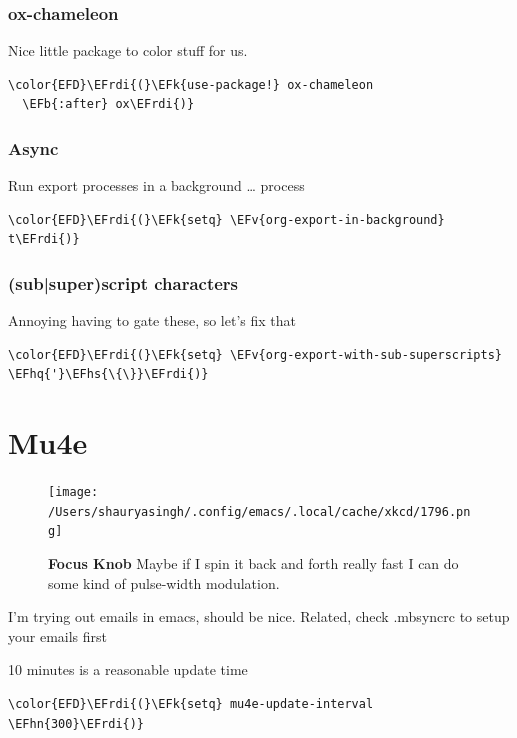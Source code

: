 \documentclass{scrartcl}
\newcommand{\EFk}[1]{\textcolor{EFk}{#1}} %
\newcommand{\EFb}[1]{\textcolor{EFb}{#1}} %
\newcommand{\EFv}[1]{\textcolor{EFv}{#1}} %
\newcommand{\EFhn}[1]{#1} %
\newcommand{\EFhq}[1]{#1} %
\newcommand{\EFhs}[1]{#1} %
\newcommand{\EFrdi}[1]{#1} %
\begin{document}
\subsubsection{ox-chameleon}
\label{sec:orgffcfcee}
Nice little package to color stuff for us.
\begin{Code}
\begin{Verbatim}[]
\color{EFD}\EFrdi{(}\EFk{use-package!} ox-chameleon
  \EFb{:after} ox\EFrdi{)}
\end{Verbatim}
\end{Code}

\subsubsection{Async}
\label{sec:org4641dd2}
Run export processes in a background \ldots{} process
\begin{Code}
\begin{Verbatim}[]
\color{EFD}\EFrdi{(}\EFk{setq} \EFv{org-export-in-background} t\EFrdi{)}
\end{Verbatim}
\end{Code}

\subsubsection{(sub|super)script characters}
\label{sec:org32b114e}
Annoying having to gate these, so let's fix that
\begin{Code}
\begin{Verbatim}[]
\color{EFD}\EFrdi{(}\EFk{setq} \EFv{org-export-with-sub-superscripts} \EFhq{'}\EFhs{\{\}}\EFrdi{)}
\end{Verbatim}
\end{Code}

\section{Mu4e}
\label{sec:org10484cd}
\begin{figure}[!htb]
	  \centering
	  \texttt{[image: /Users/shauryasingh/.config/emacs/.local/cache/xkcd/1796.png]}
  \caption*{\label{xkcd:1796} \textbf{Focus Knob} Maybe if I spin it back and forth really fast I can do some kind of pulse-width modulation.}
	\end{figure}
I'm trying out emails in emacs, should be nice. Related, check .mbsyncrc to
setup your emails first

10 minutes is a reasonable update time
\begin{Code}
\begin{Verbatim}[]
\color{EFD}\EFrdi{(}\EFk{setq} mu4e-update-interval \EFhn{300}\EFrdi{)}
\end{Verbatim}
\end{Code}
\end{document}
